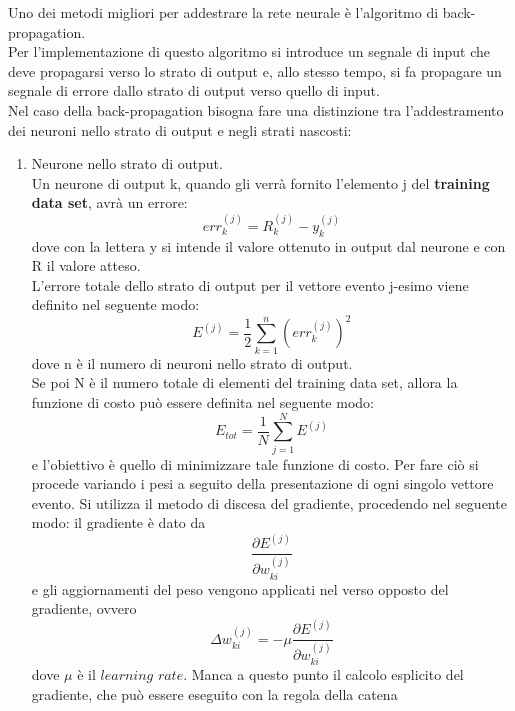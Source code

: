 Uno dei metodi migliori per addestrare la rete neurale è l'algoritmo di back-propagation. \\
Per l'implementazione di questo algoritmo si introduce un segnale di input che deve propagarsi verso lo strato di output e, allo stesso tempo, si fa propagare un segnale di errore dallo strato di output verso quello di input.\\
Nel caso della back-propagation bisogna fare una distinzione tra l'addestramento dei neuroni nello strato di output e negli strati nascosti:
\begin{enumerate}
	\item Neurone nello strato di output.\\
	Un neurone di output k, quando gli verrà fornito l'elemento j del \textbf{training data set}, avrà un errore:
	\begin{equation}
	err_k^{(j)} = R_k^{(j)} - y_k^{(j)}
	\end{equation}
	dove con la lettera y si intende il valore ottenuto in output dal neurone e con R il valore atteso. \\
	L'errore totale dello strato di output per il vettore evento j-esimo viene definito nel seguente modo:
	\begin{equation}
	E^{(j)} = \frac{1}{2} \sum_{k=1}^{n} (err_k^{(j)})^2
	\end{equation}
	dove n è il numero di neuroni nello strato di output. \\
	Se poi N è il numero totale di elementi del training data set, allora la funzione di costo può essere definita nel seguente modo:
	\begin{equation}
	E_{tot} = \frac{1}{N}\sum_{j=1}^{N} E^{(j)}
	\end{equation}
	e l'obiettivo è quello di minimizzare tale funzione di costo. Per fare ciò si procede variando i pesi a seguito della presentazione di ogni singolo vettore evento.
	Si utilizza il metodo di discesa del gradiente, procedendo nel seguente modo: il gradiente è dato da
	\begin{equation}
	\frac{\partial E^{(j)} }{\partial w_{ki}^{(j)}}
	\end{equation}
	e gli aggiornamenti del peso vengono applicati nel verso opposto del gradiente, ovvero
	\begin{equation}
	\Delta w_{ki}^{(j)} = -\mu \frac{\partial E^{(j)} }{\partial w_{ki}^{(j)}}
	\end{equation}
	dove $\mu$ è il $\textit{learning rate}$.
	Manca a questo punto il calcolo esplicito del gradiente, che può essere eseguito con la regola della catena 

\end{enumerate}
